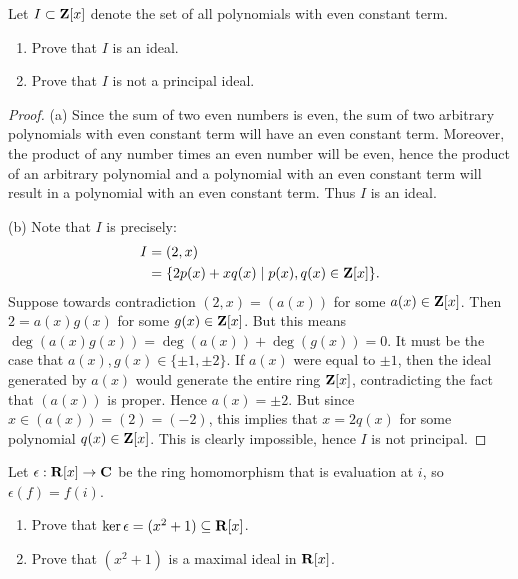 \documentclass[10pt,twoside,openany]{memoir}
\begin{document}
\begin{problem}[F19, P5]
Let $I \subset \mathbf{Z}[x]$ denote the set of all polynomials with even constant term.
    \begin{enumerate}[label = (\alph*),itemsep=1pt,topsep=3pt]
        \item Prove that $I$ is an ideal.
        \item Prove that $I$ is not a principal ideal.
    \end{enumerate}
\end{problem}
    {\color{blue} \begin{proof}
        (a) Since the sum of two even numbers is even, the sum of two arbitrary polynomials with even constant term will have an even constant term. Moreover, the product of any number times an even number will be even, hence the product of an arbitrary polynomial and a polynomial with an even constant term will result in a polynomial with an even constant term. Thus $I$ is an ideal.

        (b) Note that $I$ is precisely:
            \begin{equation*}
            \begin{split}
                I 
                & = (2,x) \\
                & = \{2p(x) + xq(x) \mid p(x),q(x) \in \mathbf{Z}[x]\}.
            \end{split}
            \end{equation*}
        Suppose towards contradiction $(2,x) = (a(x))$ for some $a(x) \in \mathbf{Z}[x]$. Then $2 = a(x) g(x)$ for some $g(x) \in \mathbf{Z}[x]$. But this means $\deg(a(x)g(x)) = \deg(a(x)) + \deg(g(x)) = 0$. It must be the case that $a(x),g(x) \in \{\pm 1, \pm2\}$. If $a(x)$ were equal to $\pm 1$, then the ideal generated by $a(x)$ would generate the entire ring $\mathbf{Z}[x]$, contradicting the fact that $(a(x))$ is proper. Hence $a(x) = \pm 2$. But since $x \in (a(x)) = (2) = (-2)$, this implies that $x = 2q(x)$ for some polynomial $q(x) \in \mathbf{Z}[x]$. This is clearly impossible, hence $I$ is not principal.
    \end{proof}}
\begin{problem}[S17, P5]
Let $\epsilon:\mathbf{R}[x] \rightarrow \mathbf{C}$ be the ring homomorphism that is evaluation at $i$, so $\epsilon(f) = f(i)$. 
\begin{enumerate}[label = (\alph*),itemsep=1pt,topsep=3pt]
    \item Prove that $\ker \epsilon = (x^2 + 1) \subseteq \mathbf{R}[x]$.
    \item Prove that $(x^2 +1)$ is a maximal ideal in $\mathbf{R}[x]$.
\end{enumerate}
\end{problem}
\end{document}
